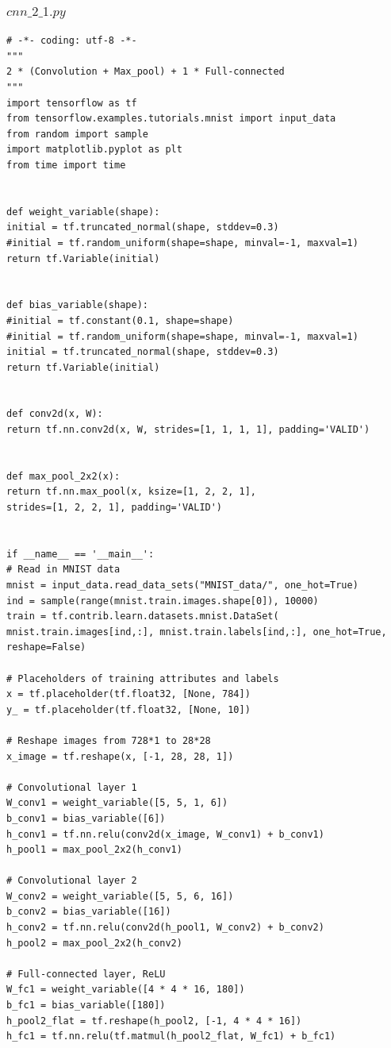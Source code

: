 \documentclass{article}
\begin{document}
\subsubsection{$cnn\_2\_1.py$}
\label{code-3}
\begin{lstlisting}
# -*- coding: utf-8 -*-
"""
2 * (Convolution + Max_pool) + 1 * Full-connected
"""
import tensorflow as tf
from tensorflow.examples.tutorials.mnist import input_data
from random import sample
import matplotlib.pyplot as plt
from time import time


def weight_variable(shape):
initial = tf.truncated_normal(shape, stddev=0.3)
#initial = tf.random_uniform(shape=shape, minval=-1, maxval=1)
return tf.Variable(initial)


def bias_variable(shape):
#initial = tf.constant(0.1, shape=shape)
#initial = tf.random_uniform(shape=shape, minval=-1, maxval=1)
initial = tf.truncated_normal(shape, stddev=0.3)
return tf.Variable(initial)


def conv2d(x, W):
return tf.nn.conv2d(x, W, strides=[1, 1, 1, 1], padding='VALID')


def max_pool_2x2(x):
return tf.nn.max_pool(x, ksize=[1, 2, 2, 1],
strides=[1, 2, 2, 1], padding='VALID')


if __name__ == '__main__':
# Read in MNIST data
mnist = input_data.read_data_sets("MNIST_data/", one_hot=True)
ind = sample(range(mnist.train.images.shape[0]), 10000)
train = tf.contrib.learn.datasets.mnist.DataSet(
mnist.train.images[ind,:], mnist.train.labels[ind,:], one_hot=True, reshape=False)

# Placeholders of training attributes and labels
x = tf.placeholder(tf.float32, [None, 784])
y_ = tf.placeholder(tf.float32, [None, 10])

# Reshape images from 728*1 to 28*28
x_image = tf.reshape(x, [-1, 28, 28, 1])

# Convolutional layer 1
W_conv1 = weight_variable([5, 5, 1, 6])
b_conv1 = bias_variable([6])
h_conv1 = tf.nn.relu(conv2d(x_image, W_conv1) + b_conv1)
h_pool1 = max_pool_2x2(h_conv1)

# Convolutional layer 2
W_conv2 = weight_variable([5, 5, 6, 16])
b_conv2 = bias_variable([16])
h_conv2 = tf.nn.relu(conv2d(h_pool1, W_conv2) + b_conv2)
h_pool2 = max_pool_2x2(h_conv2)

# Full-connected layer, ReLU
W_fc1 = weight_variable([4 * 4 * 16, 180])
b_fc1 = bias_variable([180])
h_pool2_flat = tf.reshape(h_pool2, [-1, 4 * 4 * 16])
h_fc1 = tf.nn.relu(tf.matmul(h_pool2_flat, W_fc1) + b_fc1)


\end{lstlisting}
\end{document}
